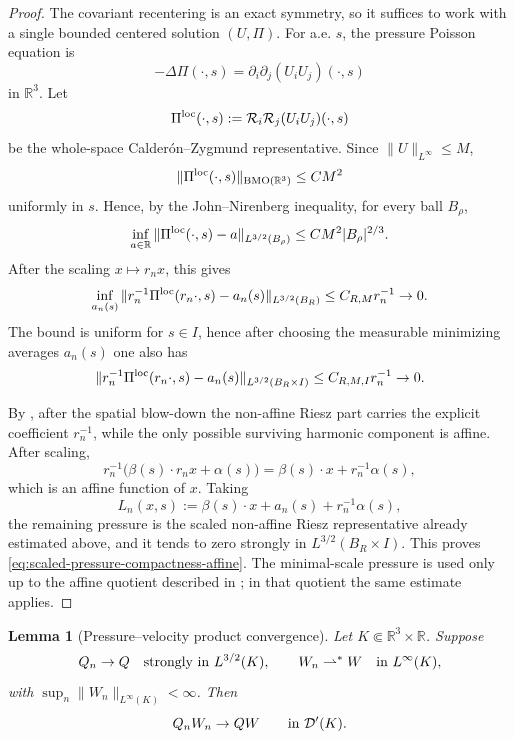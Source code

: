 \documentclass[11pt]{amsart}
\numberwithin{equation}{section}
\theoremstyle{plain}
\newtheorem{lemma}[lemma]{Lemma}
\theoremstyle{definition}
\theoremstyle{remark}
\begin{document}
\begin{proof}
The covariant recentering is an exact symmetry, so it suffices to work with a
single bounded centered solution \((U,\Pi)\).  For a.e. \(s\), the pressure
Poisson equation is
\[
   -\Delta\Pi(\cdot,s)=\partial_i\partial_j(U_iU_j)(\cdot,s)
\]
in \(\mathbb R^3\).  Let
\[
   \Pi^{\rm loc}(\cdot,s):=\mathcal R_i\mathcal R_j(U_iU_j)(\cdot,s)
\]
be the whole-space Calder\'on--Zygmund representative.  Since
\(\|U\|_{L^\infty}\le M\),
\[
   \|\Pi^{\rm loc}(\cdot,s)\|_{\mathrm{BMO}(\mathbb R^3)}
   \le C M^2
\]
uniformly in \(s\).  Hence, by the John--Nirenberg inequality, for every ball
\(B_\rho\),
\[
   \inf_{a\in\mathbb R}
   \|\Pi^{\rm loc}(\cdot,s)-a\|_{L^{3/2}(B_\rho)}
   \le C M^2 |B_\rho|^{2/3}.
\]
After the scaling \(x\mapsto r_nx\), this gives
\[
   \inf_{a_n(s)}
   \|r_n^{-1}\Pi^{\rm loc}(r_n\cdot,s)-a_n(s)\|_{L^{3/2}(B_R)}
   \le C_{R,M}r_n^{-1}\to0 .
\]
The bound is uniform for \(s\in I\), hence after choosing the measurable
minimizing averages \(a_n(s)\) one also has
\[
   \|r_n^{-1}\Pi^{\rm loc}(r_n\cdot,s)-a_n(s)\|_{L^{3/2}(B_R\times I)}
   \le C_{R,M,I}r_n^{-1}\to0 .
\]

By , after the spatial blow-down
the non-affine Riesz part carries the explicit coefficient \(r_n^{-1}\), while
the only possible surviving harmonic component is affine.  After scaling,
\[
   r_n^{-1}\bigl(\beta(s)\cdot r_nx+\alpha(s)\bigr)
   =
   \beta(s)\cdot x+r_n^{-1}\alpha(s),
\]
which is an affine function of \(x\).  Taking
\[
   L_n(x,s):=\beta(s)\cdot x+a_n(s)+r_n^{-1}\alpha(s),
\]
the remaining pressure is the scaled non-affine Riesz representative already estimated
above, and it tends to zero strongly in \(L^{3/2}(B_R\times I)\).  This proves
\eqref{eq:scaled-pressure-compactness-affine}.  The minimal-scale pressure is used
only up to the affine quotient described in
; in that quotient the same estimate
applies.
\end{proof}

\begin{lemma}[Pressure--velocity product convergence]
\label{lem:pressure-velocity-product-convergence}
Let \(K\Subset\mathbb R^3\times\mathbb R\).  Suppose
\[
   Q_n\to Q\quad\hbox{strongly in }L^{3/2}(K),
   \qquad
   W_n\rightharpoonup^\ast W\quad\hbox{in }L^\infty(K),
\]
with \(\sup_n\|W_n\|_{L^\infty(K)}<\infty\).  Then
\[
   Q_nW_n\to QW
   \qquad\hbox{in }\mathcal D'(K).
\]
\end{lemma}
\end{document}
